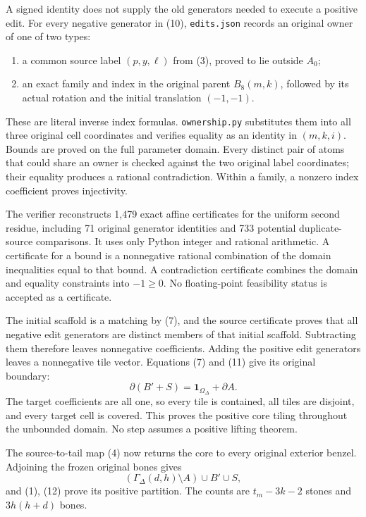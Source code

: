 \documentclass[
  11pt,
]{article}
\providecommand{\tightlist}{%
  \setlength{\itemsep}{0pt}\setlength{\parskip}{0pt}}
\begin{document}
A signed identity does not supply the old generators needed to execute a
positive edit. For every negative generator in (10), \texttt{edits.json}
records an original owner of one of two types:

\begin{enumerate}
\def\labelenumi{\arabic{enumi}.}
\tightlist
\item
  a common source label \((p,y,\ell)\) from (3), proved to lie outside
  \(A_0\);
\item
  an exact family and index in the original parent \(B_8(m,k)\),
  followed by its actual rotation and the initial translation
  \((-1,-1)\).
\end{enumerate}

These are literal inverse index formulas. \texttt{ownership.py}
substitutes them into all three original cell coordinates and verifies
equality as an identity in \((m,k,i)\). Bounds are proved on the full
parameter domain. Every distinct pair of atoms that could share an owner
is checked against the two original label coordinates; their equality
produces a rational contradiction. Within a family, a nonzero index
coefficient proves injectivity.

The verifier reconstructs 1,479 exact affine certificates for the
uniform second residue, including 71 original generator identities and
733 potential duplicate-source comparisons. It uses only Python integer
and rational arithmetic. A certificate for a bound is a nonnegative
rational combination of the domain inequalities equal to that bound. A
contradiction certificate combines the domain and equality constraints
into \(-1\ge0\). No floating-point feasibility status is accepted as a
certificate.

The initial scaffold is a matching by (7), and the source certificate
proves that all negative edit generators are distinct members of that
initial scaffold. Subtracting them therefore leaves nonnegative
coefficients. Adding the positive edit generators leaves a nonnegative
tile vector. Equations (7) and (11) give its original boundary: \[
 \partial(B'+S)=\mathbf1_{\Omega_\Delta}+\partial A.        \tag{12}
\] The target coefficients are all one, so every tile is contained, all
tiles are disjoint, and every target cell is covered. This proves the
positive core tiling throughout the unbounded domain. No step assumes a
positive lifting theorem.

The source-to-tail map (4) now returns the core to every original
exterior benzel. Adjoining the frozen original bones gives \[
 (\Gamma_\Delta(d,h)\setminus A)\cup B'\cup S,              \tag{13}
\] and (1), (12) prove its positive partition. The counts are
\(t_m-3k-2\) stones and \(3h(h+d)\) bones.
\end{document}
